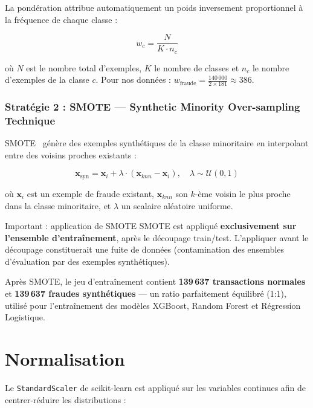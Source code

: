 \documentclass[12pt,a4paper,twoside]{report}
\theoremstyle{definition}
\begin{document}
La pondération attribue automatiquement un poids inversement proportionnel à la
fréquence de chaque classe :

\begin{equation}
w_c = \frac{N}{K \cdot n_c}
\label{eq:class_weight}
\end{equation}

où $N$ est le nombre total d'exemples, $K$ le nombre de classes et $n_c$ le nombre
d'exemples de la classe $c$. Pour nos données :
$w_{\text{fraude}} = \frac{140\,000}{2 \times 181} \approx 386$.

\subsubsection{Stratégie 2 : SMOTE — Synthetic Minority Over-sampling Technique}

SMOTE~\cite{chawla2002smote} génère des exemples synthétiques de la classe
minoritaire en interpolant entre des voisins proches existants :

\begin{equation}
\mathbf{x}_{\text{syn}} = \mathbf{x}_i + \lambda \cdot (\mathbf{x}_{knn} - \mathbf{x}_i),
\quad \lambda \sim \mathcal{U}(0, 1)
\label{eq:smote}
\end{equation}

où $\mathbf{x}_i$ est un exemple de fraude existant, $\mathbf{x}_{knn}$ son
$k$-ème voisin le plus proche dans la classe minoritaire, et $\lambda$ un scalaire
aléatoire uniforme.

\begin{pwcbox}{Important : application de SMOTE}
SMOTE est appliqué \textbf{exclusivement sur l'ensemble d'entraînement},
après le découpage train/test. L'appliquer avant le découpage constituerait
une fuite de données (contamination des ensembles d'évaluation par des
exemples synthétiques).
\end{pwcbox}

Après SMOTE, le jeu d'entraînement contient \textbf{139\,637 transactions normales}
et \textbf{139\,637 fraudes synthétiques} — un ratio parfaitement équilibré (1:1),
utilisé pour l'entraînement des modèles XGBoost, Random Forest et Régression Logistique.

\section{Normalisation}

Le \texttt{StandardScaler} de scikit-learn est appliqué sur les variables continues
afin de centrer-réduire les distributions :
\end{document}
